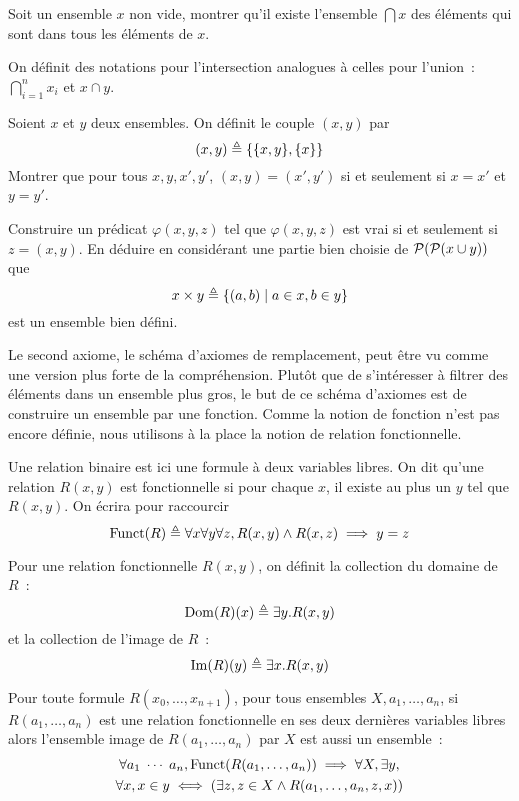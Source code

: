\begin{exercise}
  Soit un ensemble $x$ non vide, montrer qu'il existe l'ensemble $\bigcap x$ des
  éléments qui sont dans tous les éléments de $x$.
\end{exercise}

\begin{notation}
  On définit des notations pour l'intersection analogues à celles pour l'union~:
  $\displaystyle\bigcap_{i = 1}^n x_i$ et $x \cap y$.
\end{notation}

\begin{exercise}\label{exo.ZF.prod}
  Soient $x$ et $y$ deux ensembles. On définit le couple $(x,y)$ par
  \[(x,y) \triangleq \{\{x,y\},\{x\}\}\]
  Montrer que pour tous $x,y,x',y'$, $(x,y) = (x',y')$ si et seulement si
  $x=x'$ et $y=y'$.

  Construire un prédicat $\varphi(x,y,z)$ tel que $\varphi(x,y,z)$ est vrai
  si et seulement si $z = (x,y)$. En déduire en considérant une partie bien
  choisie de $\mathcal{P} (\mathcal{P}(x\cup y))$ que
  \[x\times y \triangleq \{(a,b)\mid a \in x, b \in y\}\]
  est un ensemble bien défini.
\end{exercise}

Le second axiome, le schéma d'axiomes de remplacement, peut être vu comme une
version plus forte de la compréhension. Plutôt que de s'intéresser à filtrer des
éléments dans un ensemble plus gros, le but de ce schéma d'axiomes est de
construire un ensemble par une fonction. Comme la notion de fonction n'est pas
encore définie, nous utilisons à la place la notion de relation fonctionnelle.

\begin{definition}
  Une relation binaire est ici une formule à deux variables libres. On dit
  qu'une relation $R(x,y)$ est fonctionnelle si pour chaque $x$, il existe au
  plus un $y$ tel que $R(x,y)$. On écrira pour raccourcir
  \[\operatorname{Funct}(R) \triangleq \forall x\forall y\forall z, R(x,y)\land R(x,z)\implies
  y = z\]

  Pour une relation fonctionnelle $R(x,y)$, on définit la collection du domaine
  de $R$~:
  \[\operatorname{Dom}(R)(x)\triangleq \exists y. R(x,y)\]
  et la collection de l'image de $R$~:
  \[\operatorname{Im}(R)(y)\triangleq \exists x. R(x,y)\]
\end{definition}

\begin{axiom}\label{ax.ZF.repl}
  Pour toute formule $R(x_0,\ldots,x_{n+1})$, pour tous ensembles
  $X,a_1,\ldots,a_n$, si $R(a_1,\ldots,a_n)$ est une relation fonctionnelle en
  ses deux dernières variables libres alors l'ensemble image de
  $R(a_1,\ldots,a_n)$ par $X$ est aussi un ensemble~:
  \begin{multline*}
    \forall a_1\;\cdots\;a_n, \operatorname{Funct}(R(a_1,\ldots,a_n))\implies \forall X,
    \exists y,\\
    \forall x, x \in y \iff (\exists z, z\in X \land R(a_1,\ldots,a_n,z,x))
  \end{multline*}
\end{axiom}

